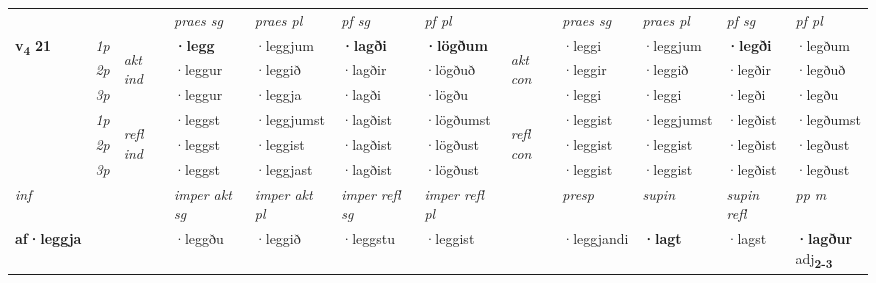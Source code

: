 \begin{longtable}[l]{X>{\footnotesize\itshape}llXXXXlXXXX}
\midrule

 & &   & \textit{praes sg}  & \textit{praes pl}    & \textit{ pf sg} & \textit{pf pl} & & \textit{praes sg}  & \textit{praes pl}    & \textit{pf sg} & \textit{pf pl }  \\ \cmidrule{4-7} \cmidrule{9-12}
 \multirow{2}{*}{{{\textbf{v{\textsubscript{4}}} \Large{\textbf{21}}}}}  & 1p & \multirow{3}{*}{\begin{turn}{90}\textit{akt ind}\end{turn}} & \textbf{·legg} & ·leggjum & \textbf{·lagði} & \textbf{·lögðum} & \multirow{3}{*}{\begin{turn}{90}\textit{akt con}\end{turn}} &·leggi & ·leggjum & \textbf{·legði} & ·legðum\\*
 & 2p &  &  ·leggur  & ·leggið & ·lagðir & ·lögðuð & & ·leggir & ·leggið & ·legðir & ·legðuð \\*
 & 3p &  & ·leggur & ·leggja & ·lagði & ·lögðu & & ·leggi & ·leggi& ·legði & ·legðu \\*
\cmidrule{4-7} \cmidrule{9-12}
 & 1p & \multirow{3}{*}{\begin{turn}{90}\textit{refl ind}\end{turn}}  & ·leggst & ·leggjumst & ·lagðist & ·lögðumst & \multirow{3}{*}{\begin{turn}{90}\textit{refl con}\end{turn}}  &·leggist & ·leggjumst & ·legðist & ·legðumst \\*
 & 2p &  & ·leggst & ·leggist & ·lagðist & ·lögðust & &·leggist & ·leggist & ·legðist & ·legðust \\*
 & 3p  & & ·leggst & ·leggjast & ·lagðist & ·lögðust & & ·leggist & ·leggist& ·legðist & ·legðust \\*
\cmidrule{4-7} \cmidrule{9-12}

   {\textit{inf}} & &  & \textit{imper akt sg} & \textit{imper akt pl} & \textit{imper refl sg} & \textit{imper refl pl} && \textit{presp} & \textit{supin} & \textit{supin refl} & \textit{pp m} \\*
  {\textbf{af\allowbreak ·leggja}} & && ·leggðu  & ·leggið & ·leggstu & ·leggist && ·leggjandi &  \textbf{·lagt} & ·lagst & \specialcell{\textbf{·lagður} \\ adj\textbf{\textsubscript{2-3}}} \\*

\midrule


\end{longtable}
